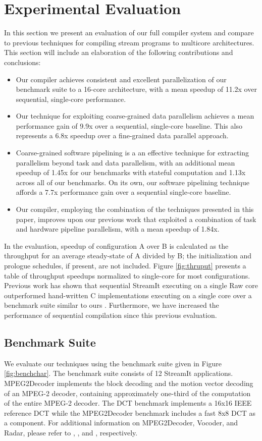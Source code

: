\section{Experimental Evaluation}
\label{sec:results}
In this section we present an evaluation of our full compiler system
and compare to previous techniques for compiling stream programs to
multicore architectures.  This section will include an elaboration of
the following contributions and conclusions:

\begin{itemize}
\item Our compiler achieves consistent and excellent parallelization of our
benchmark suite to a 16-core architecture, with a mean speedup of 
11.2x over sequential, single-core performance.
\item Our technique for exploiting coarse-grained data parallelism
achieves a mean performance gain of 9.9x over a sequential,
single-core baseline.  This also represents a 6.8x speedup over a 
fine-grained data parallel approach.
\item Coarse-grained software pipelining is a
an effective technique for extracting parallelism beyond task and data
parallelism, with an additional mean speedup of 1.45x for
our benchmarks with stateful computation and 1.13x across all of our
benchmarks. On its own, our software pipelining technique affords a
7.7x performance gain over a sequential single-core baseline.
\item Our compiler, employing the combination of the techniques
presented in this paper, improves upon our previous work that
exploited a combination of task and hardware pipeline parallelism,
with a mean speedup of 1.84x.
\end{itemize}

In the evaluation, speedup of configuration A over B is calculated as
the throughput for an average steady-state of A divided by B; the
initialization and prologue schedules, if present, are not
included. Figure \ref{fig:thruput} presents a table of throughput
speedups normalized to single-core for most configurations.  Previous
work has shown that sequential StreamIt executing on a single Raw core
outperformed hand-written C implementations executing on a single core
over a benchmark suite similar to ours \cite{raw_isca}. Furthermore,
we have increased the performance of sequential compilation since this
previous evaluation.

\subsection{Benchmark Suite}
We evaluate our techniques using the benchmark suite given in Figure
\ref{fig:benchchar}.  The benchmark suite consists of 12 StreamIt
applications. MPEG2Decoder implements the block decoding and the
motion vector decoding of an MPEG-2 decoder, containing approximately
one-third of the computation of the entire MPEG-2 decoder.  The DCT
benchmark implements a 16x16 IEEE reference DCT while the MPEG2Decoder
benchmark includes a fast 8x8 DCT as a component.  For additional
information on MPEG2Decoder, Vocoder, and Radar, please refer to
\cite{ipdps2006}, \cite{seneff80}, and \cite{pca}, respectively.

